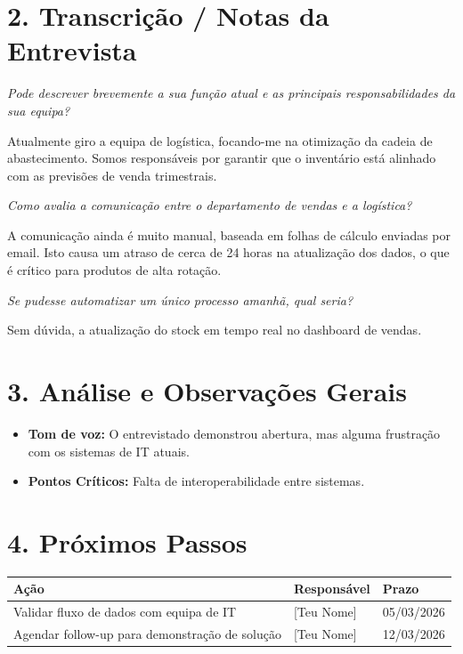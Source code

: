 \documentclass[11pt,a4paper]{article}
\newcommand{\pergunta}[1]{\item[E:] \textit{#1}}
\newcommand{\resposta}[1]{\item[R:] #1}
\begin{document}
	\section*{2. Transcrição / Notas da Entrevista}
	
	\begin{transcription}
		
		\pergunta{Pode descrever brevemente a sua função atual e as principais responsabilidades da sua equipa?}
		\resposta{Atualmente giro a equipa de logística, focando-me na otimização da cadeia de abastecimento. Somos responsáveis por garantir que o inventário está alinhado com as previsões de venda trimestrais.}
		
		\pergunta{Como avalia a comunicação entre o departamento de vendas e a logística?}
		\resposta{A comunicação ainda é muito manual, baseada em folhas de cálculo enviadas por email. Isto causa um atraso de cerca de 24 horas na atualização dos dados, o que é crítico para produtos de alta rotação.}
		
		\pergunta{Se pudesse automatizar um único processo amanhã, qual seria?}
		\resposta{Sem dúvida, a atualização do stock em tempo real no dashboard de vendas.}
		
	\end{transcription}
	
	\vspace{0.8cm}
	
	\section*{3. Análise e Observações Gerais}
	\begin{itemize}[leftmargin=*]
		\item \textbf{Tom de voz:} O entrevistado demonstrou abertura, mas alguma frustração com os sistemas de IT atuais.
		\item \textbf{Pontos Críticos:} Falta de interoperabilidade entre sistemas.
	\end{itemize}
	
	\section*{4. Próximos Passos}
	\begin{tabularx}{\textwidth}{@{}|X|l|l|@{}}
		\hline
		\rowcolor{gray!10} \textbf{Ação} & \textbf{Responsável} & \textbf{Prazo} \\ \hline
		Validar fluxo de dados com equipa de IT & [Teu Nome] & 05/03/2026 \\ \hline
		Agendar follow-up para demonstração de solução & [Teu Nome] & 12/03/2026 \\ \hline
	\end{tabularx}
	
\end{document}
